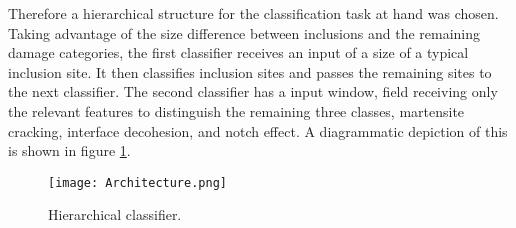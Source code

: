 Therefore a hierarchical structure for the classification task at hand was chosen. Taking advantage of the size difference between inclusions and the remaining damage categories, the first classifier receives an input of a size of a typical inclusion site. It then classifies inclusion sites and passes the remaining sites to the next classifier. The second classifier has a input window, field receiving only the relevant features to distinguish the remaining three classes, martensite cracking, interface decohesion, and notch effect. A diagrammatic depiction of this is shown in figure \ref{fig:Architecture}.\\

%
%

\begin{figure}[H]
\begin{center}
  \texttt{[image: Architecture.png]}
\caption{Hierarchical classifier.}
\label{fig:Architecture}
\end{center}
\end{figure}

